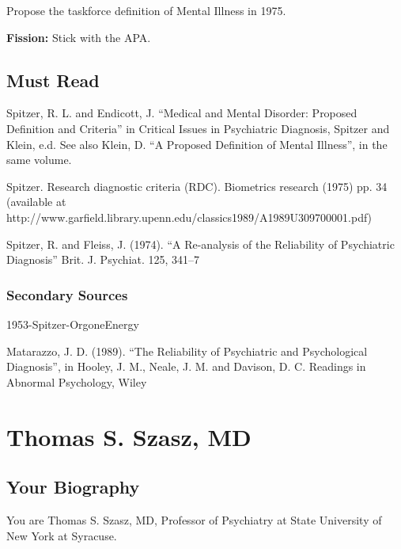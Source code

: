 \begin{refsection}
Propose the taskforce definition of Mental Illness in 1975.

\textbf{Fission:} Stick with the APA.

\section{Must Read}
\label{mustread}

Spitzer, R. L. and Endicott, J. “Medical and Mental Disorder: Proposed Definition and Criteria” in Critical Issues in Psychiatric Diagnosis, Spitzer and Klein, e.d. See also Klein, D. “A Proposed Definition of Mental Illness”, in the same volume.

Spitzer. Research diagnostic criteria (RDC). Biometrics research (1975) pp. 34 (available at http:\slash \slash www.garfield.library.upenn.edu\slash classics1989\slash A1989U309700001.pdf)

Spitzer, R. and Fleiss, J. (1974). “A Re-analysis of the Reliability of Psychiatric Diagnosis” Brit. J. Psychiat. 125, 341--7

\subsection{Secondary Sources}
\label{secondarysources}

1953-Spitzer-OrgoneEnergy

Matarazzo, J. D. (1989). “The Reliability of Psychiatric and Psychological Diagnosis”, in Hooley, J. M., Neale, J. M. and Davison, D. C. Readings in Abnormal Psychology, Wiley

\chapter{Thomas S. Szasz, MD}
\label{thomass.szaszmd}

\section{Your Biography}
\label{yourbiography}

You are Thomas S. Szasz, MD, Professor of Psychiatry at State University of New York at Syracuse.


\end{refsection}
